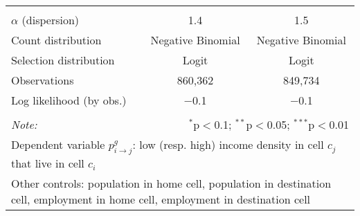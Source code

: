 \begin{table}[!htbp]
{\begin{tabular}{@{\extracolsep{5pt}}lcccc}
\hline \hline \\[-1.8ex]
$\alpha$ (dispersion) & \multicolumn{2}{c}{1.4} & \multicolumn{2}{c}{1.5} \\
Count distribution & \multicolumn{2}{c}{Negative Binomial} & \multicolumn{2}{c}{Negative Binomial} \\
Selection distribution & \multicolumn{2}{c}{Logit} & \multicolumn{2}{c}{Logit} \\
Observations & \multicolumn{2}{c}{860,362} & \multicolumn{2}{c}{849,734} \\
Log likelihood (by obs.) & \multicolumn{2}{c}{$-$0.1} & \multicolumn{2}{c}{$-$0.1} \\
\hline \\[-1.8ex]
\textit{Note:}  & \multicolumn{4}{r}{$^{*}$p$<$0.1; $^{**}$p$<$0.05; $^{***}$p$<$0.01} \\
 \multicolumn{5}{p{0.9\linewidth}}{\parbox[t]{\textwidth}{Dependent variable $p_{i \to j}^g$: low (resp. high) income density in cell $c_j$ that live in cell $c_i$}} \\
 \multicolumn{5}{p{0.9\linewidth}}{\parbox[t]{\textwidth}{Other controls: population in home cell, population in destination cell, employment in home cell, employment in destination cell}}

\end{tabular}
}
\end{table}
